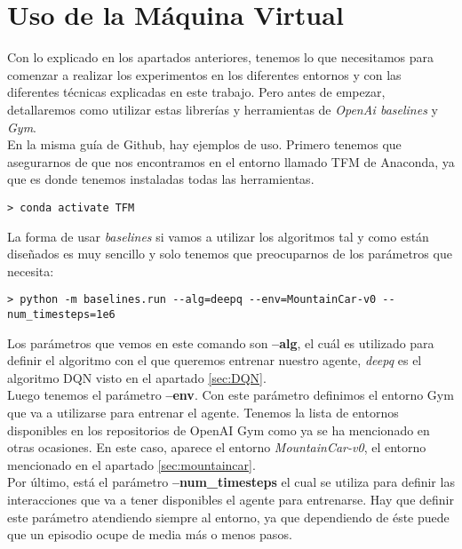 \documentclass[11pt,fleqn]{book} %
\begin{document}
\chapter{Uso de la Máquina Virtual}\label{sec:usomaquina}

Con lo explicado en los apartados anteriores, tenemos lo que necesitamos para comenzar a realizar los experimentos en los diferentes entornos y con las diferentes técnicas explicadas en este trabajo. Pero antes de empezar, detallaremos como utilizar estas librerías y herramientas de \textit{OpenAi baselines} y \textit{Gym}. \\

En la misma guía de Github\cite{article:baselines}, hay ejemplos de uso. Primero tenemos que asegurarnos de que nos encontramos en el entorno llamado TFM de Anaconda, ya que es donde tenemos instaladas todas las herramientas. \\

\begin{verbatim}
> conda activate TFM
\end{verbatim}

La forma de usar \textit{baselines} si vamos a utilizar los algoritmos tal y como están diseñados es muy sencillo y solo tenemos que preocuparnos de los parámetros que necesita:

\begin{verbatim}
> python -m baselines.run --alg=deepq --env=MountainCar-v0 --num_timesteps=1e6
\end{verbatim}

Los parámetros que vemos en este comando son \textbf{--alg}, el cuál es utilizado para definir el algoritmo con el que queremos entrenar nuestro agente, \textit{deepq} es el algoritmo DQN visto en el apartado \ref{sec:DQN}. \\

Luego tenemos el parámetro \textbf{--env}. Con este parámetro definimos el entorno Gym que va a utilizarse para entrenar el agente. Tenemos la lista de entornos disponibles en los repositorios de OpenAI Gym como ya se ha mencionado en otras ocasiones. En este caso, aparece el entorno \textit{MountainCar-v0}, el entorno mencionado en el apartado \ref{sec:mountaincar}. \\

Por último, está el parámetro \textbf{--num\_timesteps} el cual se utiliza para definir las interacciones que va a tener disponibles el agente para entrenarse. Hay que definir este parámetro atendiendo siempre al entorno, ya que dependiendo de éste puede que un episodio ocupe de media más o menos pasos. \\
\end{document}
